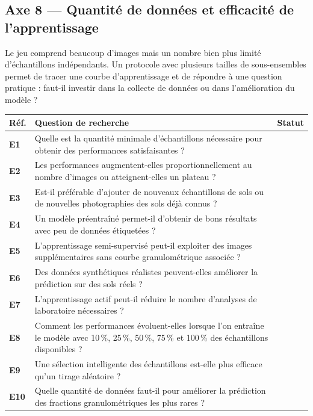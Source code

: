 \documentclass[11pt,a4paper]{article}
\makeatletter
\newenvironment{qtable}{%
  \par\smallskip
  \begin{longtable}{@{}>{\bfseries}p{1.0cm} p{12.3cm} p{1.5cm}@{}}
  \toprule
  \textbf{Réf.} & \textbf{Question de recherche} & \textbf{Statut}\\
  \midrule
  \endhead
}{%
  \bottomrule
  \end{longtable}
}
\makeatother
\begin{document}
\subsection*{Axe 8 --- Quantité de données et efficacité de l'apprentissage}
Le jeu comprend beaucoup d'images mais un nombre bien plus limité d'échantillons indépendants. Un protocole avec plusieurs tailles de sous-ensembles permet de tracer une courbe d'apprentissage et de répondre à une question pratique : faut-il investir dans la collecte de données ou dans l'amélioration du modèle ?
\begin{qtable}
E1 & Quelle est la quantité minimale d'échantillons nécessaire pour obtenir des performances satisfaisantes ? & \\
E2 & Les performances augmentent-elles proportionnellement au nombre d'images ou atteignent-elles un plateau ? & \\
E3 & Est-il préférable d'ajouter de nouveaux échantillons de sols ou de nouvelles photographies des sols déjà connus ? & \\
E4 & Un modèle préentraîné permet-il d'obtenir de bons résultats avec peu de données étiquetées ? & \\
E5 & L'apprentissage semi-supervisé peut-il exploiter des images supplémentaires sans courbe granulométrique associée ? & \\
E6 & Des données synthétiques réalistes peuvent-elles améliorer la prédiction sur des sols réels ? & \\
E7 & L'apprentissage actif peut-il réduire le nombre d'analyses de laboratoire nécessaires ? & \\
E8 & Comment les performances évoluent-elles lorsque l'on entraîne le modèle avec 10\,\%, 25\,\%, 50\,\%, 75\,\% et 100\,\% des échantillons disponibles ? & \\
E9 & Une sélection intelligente des échantillons est-elle plus efficace qu'un tirage aléatoire ? & \\
E10 & Quelle quantité de données faut-il pour améliorer la prédiction des fractions granulométriques les plus rares ? & \\
\end{qtable}
\end{document}
